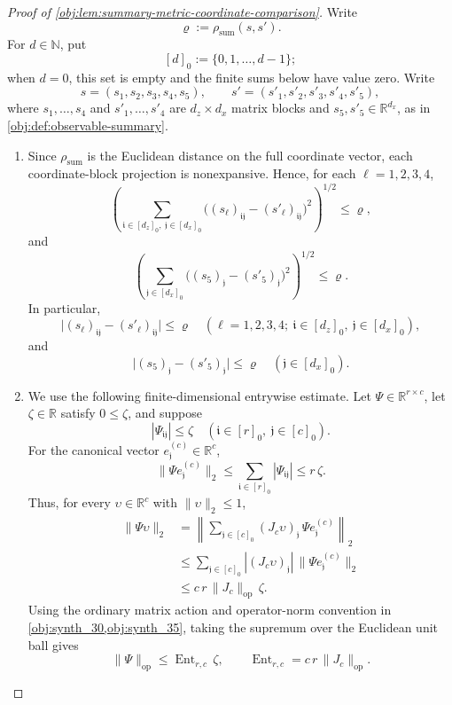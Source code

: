\begin{proof}[Proof of \cref{obj:lem:summary-metric-coordinate-comparison}]
Write
\[
\varrho:=\rho_{\mathrm{sum}}(s,s').
\]
For \(d\in\mathbb N\), put
\[
[d]_0:=\{0,1,\ldots,d-1\};
\]
when \(d=0\), this set is empty and the finite sums below have value zero.  Write
\[
s=(s_1,s_2,s_3,s_4,s_5),
\qquad
s'=(s'_1,s'_2,s'_3,s'_4,s'_5),
\]
where \(s_1,\ldots,s_4\) and \(s'_1,\ldots,s'_4\) are \(d_z\times d_x\) matrix
blocks and \(s_5,s'_5\in\mathbb R^{d_x}\), as in
\cref{obj:def:observable-summary}.

\begin{enumerate}
\item Since \(\rho_{\mathrm{sum}}\) is the Euclidean distance on the full
coordinate vector, each coordinate-block projection is nonexpansive.  Hence,
for each \(\ell=1,2,3,4\),
\[
\left(
  \sum_{\mathfrak i\in[d_z]_0,\ \mathfrak j\in[d_x]_0}
  \bigl((s_\ell)_{\mathfrak i\mathfrak j}
        -(s'_\ell)_{\mathfrak i\mathfrak j}\bigr)^2
\right)^{1/2}
\le \varrho,
\]
and
\[
\left(
  \sum_{\mathfrak j\in[d_x]_0}
  \bigl((s_5)_{\mathfrak j}-(s'_5)_{\mathfrak j}\bigr)^2
\right)^{1/2}
\le \varrho .
\]
In particular,
\[
\bigl|(s_\ell)_{\mathfrak i\mathfrak j}
      -(s'_\ell)_{\mathfrak i\mathfrak j}\bigr|
\le \varrho
\quad
(\ell=1,2,3,4;\ \mathfrak i\in[d_z]_0,\ \mathfrak j\in[d_x]_0),
\]
and
\[
\bigl|(s_5)_{\mathfrak j}-(s'_5)_{\mathfrak j}\bigr|
\le \varrho
\quad(\mathfrak j\in[d_x]_0).
\]

\item We use the following finite-dimensional entrywise estimate.  Let
\(\Psi\in\mathbb R^{r\times c}\), let \(\zeta\in\mathbb R\) satisfy
\(0\le\zeta\), and suppose
\[
|\Psi_{\mathfrak i\mathfrak j}|\le \zeta
\quad
(\mathfrak i\in[r]_0,\ \mathfrak j\in[c]_0).
\]
For the canonical vector \(e^{(c)}_{\mathfrak j}\in\mathbb R^c\),
\[
\|\Psi e^{(c)}_{\mathfrak j}\|_2
\le
\sum_{\mathfrak i\in[r]_0}|\Psi_{\mathfrak i\mathfrak j}|
\le r\,\zeta .
\]
Thus, for every \(\upsilon\in\mathbb R^c\) with \(\|\upsilon\|_2\le1\),
\[
\begin{aligned}
\|\Psi\upsilon\|_2
&=
\left\|
\sum_{\mathfrak j\in[c]_0}
(J_c\upsilon)_{\mathfrak j}\,\Psi e^{(c)}_{\mathfrak j}
\right\|_2  \\
&\le
\sum_{\mathfrak j\in[c]_0}
|(J_c\upsilon)_{\mathfrak j}|\,
\|\Psi e^{(c)}_{\mathfrak j}\|_2  \\
&\le
c\,r\,\|J_c\|_{\mathrm{op}}\,\zeta .
\end{aligned}
\]
Using the ordinary matrix action and operator-norm convention in
\cref{obj:synth_30,obj:synth_35}, taking the supremum over the Euclidean
unit ball gives
\[
\|\Psi\|_{\mathrm{op}}
\le
\operatorname{Ent}_{r,c}\,\zeta,
\qquad
\operatorname{Ent}_{r,c}=c\,r\,\|J_c\|_{\mathrm{op}} .
\]


\end{enumerate}
\end{proof}
